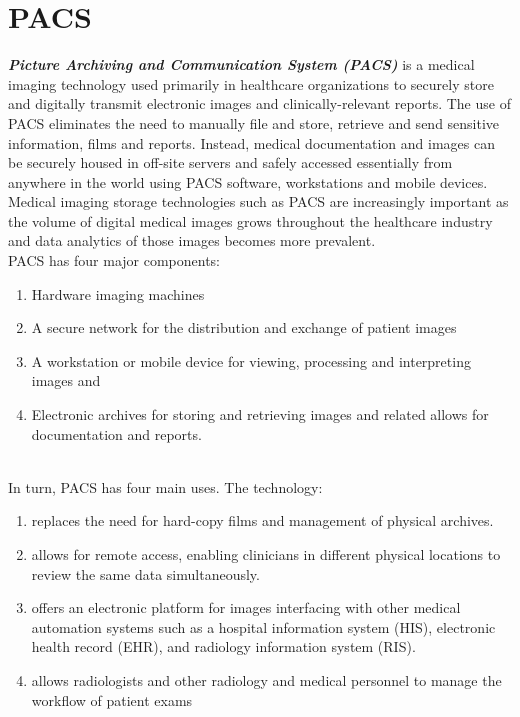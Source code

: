 \documentclass[12pt]{article}
\begin{document}
\section{PACS}
\textbf{\emph{Picture Archiving and Communication System (PACS)}} is a medical imaging technology used primarily in healthcare organizations to securely store and digitally transmit electronic images and clinically-relevant reports. The use of PACS eliminates the need to manually file and store, retrieve and send sensitive information, films and reports. Instead, medical documentation and images can be securely housed in off-site servers and safely accessed essentially from anywhere in the world using PACS software, workstations and mobile devices. \newline \\
Medical imaging storage technologies such as PACS are increasingly important as the volume of digital medical images grows throughout the healthcare industry and data analytics of those images becomes more prevalent. \newline \\
PACS has four major components: 
\begin{enumerate}
\item  Hardware imaging machines
\item A secure network for the distribution and exchange of patient images 
\item A workstation or mobile device for viewing, processing and interpreting images and 
\item Electronic archives for storing and retrieving images and related allows for documentation and reports. 
\end{enumerate} \\
In turn, PACS has four main uses. The technology: 
\begin{enumerate}
\item replaces the need for hard-copy films and management of physical archives.
 \item allows for remote access, enabling clinicians in different physical locations to review the  same data simultaneously.
\item  offers an electronic platform for images interfacing with other medical automation systems such as a hospital information system (HIS), electronic health record (EHR), and radiology information system (RIS).
 \item allows radiologists and other radiology and medical personnel to manage the workflow of patient exams
 \end{enumerate} \\
\end{document}
